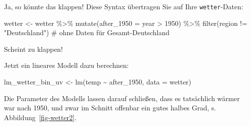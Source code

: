 \documentclass[
  a4paper,
]{scrbook}
\newenvironment{Shaded}{\begin{snugshade}}{\end{snugshade}}
\newcommand{\AttributeTok}[1]{\textcolor[rgb]{0.40,0.45,0.13}{#1}}
\newcommand{\CommentTok}[1]{\textcolor[rgb]{0.37,0.37,0.37}{#1}}
\newcommand{\DecValTok}[1]{\textcolor[rgb]{0.68,0.00,0.00}{#1}}
\newcommand{\FunctionTok}[1]{\textcolor[rgb]{0.28,0.35,0.67}{#1}}
\newcommand{\NormalTok}[1]{\textcolor[rgb]{0.00,0.23,0.31}{#1}}
\newcommand{\OtherTok}[1]{\textcolor[rgb]{0.00,0.23,0.31}{#1}}
\newcommand{\SpecialCharTok}[1]{\textcolor[rgb]{0.37,0.37,0.37}{#1}}
\newcommand{\StringTok}[1]{\textcolor[rgb]{0.13,0.47,0.30}{#1}}
\theoremstyle{definition}
\theoremstyle{definition}
\theoremstyle{definition}
\theoremstyle{remark}
\begin{document}
Ja, so könnte das klappen! Diese Syntax übertragen Sie auf Ihre
\texttt{wetter}-Daten:

\begin{Shaded}
\begin{Highlighting}[]
\NormalTok{wetter }\OtherTok{\textless{}{-}}
\NormalTok{  wetter }\SpecialCharTok{\%\textgreater{}\%} 
  \FunctionTok{mutate}\NormalTok{(}\AttributeTok{after\_1950 =}\NormalTok{ year }\SpecialCharTok{\textgreater{}} \DecValTok{1950}\NormalTok{) }\SpecialCharTok{\%\textgreater{}\%} 
  \FunctionTok{filter}\NormalTok{(region }\SpecialCharTok{!=} \StringTok{"Deutschland"}\NormalTok{)  }\CommentTok{\# ohne Daten für Gesamt{-}Deutschland}
\end{Highlighting}
\end{Shaded}

Scheint zu klappen!

Jetzt ein lineares Modell dazu berechnen:

\begin{Shaded}
\begin{Highlighting}[]
\NormalTok{lm\_wetter\_bin\_uv }\OtherTok{\textless{}{-}} \FunctionTok{lm}\NormalTok{(temp }\SpecialCharTok{\textasciitilde{}}\NormalTok{ after\_1950, }\AttributeTok{data =}\NormalTok{ wetter)}
\end{Highlighting}
\end{Shaded}

Die Parameter des Modells lassen darauf schließen, dass es tatsächlich
wärmer war nach 1950, und zwar im Schnitt offenbar ein gutes halbes
Grad, s. Abbildung~\ref{fig-wetter2}.
\end{document}

